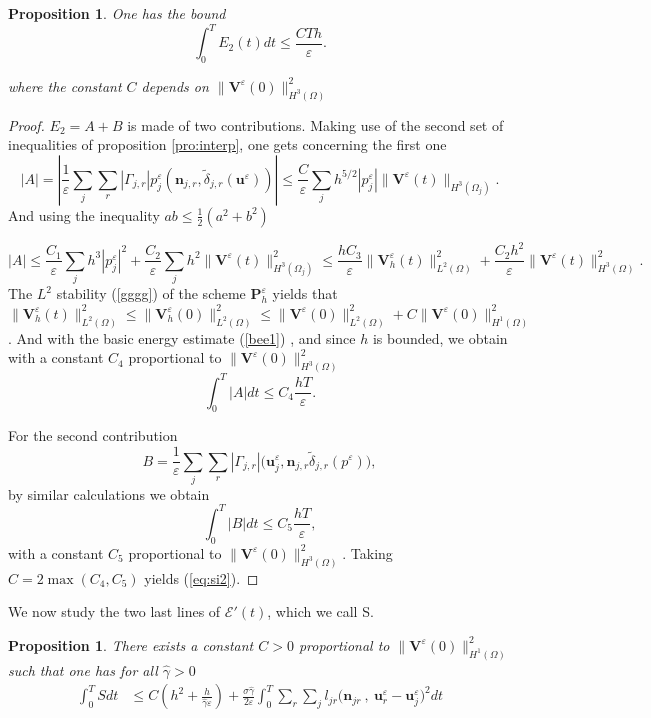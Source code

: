 \documentclass[a4paper,french,english,10pt]{article}
\newcommand\ljr{l_{jr}}
\newcommand\njr{\mathbf{n}_{jr}}
\newcommand\uu{\mathbf{u}}
\newcommand\eps{\varepsilon}
\newtheorem{pro}[theorem]{Proposition}
\begin{document}
\begin{pro} \label{pro:e2}
One has the bound
\begin{equation} \label{eq:si2}
\int_0^T E_2(t) dt \leq  \frac{CTh}{\eps} .
\end{equation} 

where the constant $C$ depends   on $\|  \mathbf V ^\eps (0) \|^2_  { H^3(\Omega)  }$
\end{pro}
\begin{proof}
$E_2=A+B$ is made of two contributions.
Making use of the second set of inequalities
of proposition \ref{pro:interp}, one gets concerning the first one
$$
| A|= \left |
\frac{1}{\eps}\sum_j \sum_r  |\Gamma_{j,r} | p_j^{\eps} (\mathbf{n}_{j,r} ,
\tilde{\delta}_{j,r}(\uu^{\eps}) ) 
\right |
\leq 
\frac{C}{\eps}  \sum_j h^{5/2} | p_j  ^\eps |
 \|  \mathbf V ^\eps (t) \|_  { H^3(\Omega_j)  }.
$$
And using the inequality $ab\leq \frac{1}{2}(a^2+b^2)$ 

$$
| A|\leq 
\frac{C_1}{\eps}  \sum_j h^{3} | p_j  ^\eps |^2 + \frac{C_2}{\eps} \sum_j h^{2} 
 \|  \mathbf V ^\eps (t) \|^2_  { H^3(\Omega_j)  }
 \leq 
\frac{hC_3}{\eps} \|  \mathbf V_h ^\eps (t) \|^2_  { L^2(\Omega)  } + \frac{C_2h^2}{\eps}  
 \|  \mathbf V ^\eps (t) \|^2_  { H^3(\Omega)  }.
$$
The $L^2$ stability  (\ref{gggg})  of the scheme $\mathbf P_h ^\eps$ yields
that $\|  \mathbf V_h ^\eps (t) \|^2_  { L^2(\Omega)  }\leq
\|  \mathbf V_h ^\eps (0) \|^2_  { L^2(\Omega)  }\leq\|  \mathbf V ^\eps (0) \|^2_  { L^2(\Omega)  }+C \|  \mathbf V ^\eps (0) \|^2_  { H^1(\Omega)  } $.
And with  the basic energy estimate (\ref{bee1}) , and since $h$ is bounded, we obtain with a constant $C_4$ proportional to  $   \|  \mathbf V ^\eps (0) \|^2_  { H^3(\Omega)  }$ 
$$\int_0^T\vert A \vert dt \leq C_4 \frac{hT}{\eps}.$$

For the  second contribution$$
B=\frac{1}{\eps}\sum_j \sum_r |\Gamma_{j,r} | \bigg(
\mathbf{u}_j^{\eps} , \mathbf{n}_{j,r} \tilde{\delta}_{j,r}(p^{\eps}) \bigg),
$$
by similar calculations we obtain
$$\int_0^T\vert B \vert dt \leq C_5 \frac{hT}{\eps},$$
with a constant $C_5$ proportional to $  \|  \mathbf V ^\eps (0) \|^2_  { H^3(\Omega)  }$. Taking $C=2\max(C_4,C_5)$ yields (\ref{eq:si2}).
\end{proof}

We now study the two last lines of $\mathscr{E}'(t)$, which we call S. 
\begin{pro}  \label{pro:conv2}
There exists a constant $C>0$ proportional to $  \|  \mathbf V ^\eps (0) \|^2_  { H^1(\Omega)  }$ such that one has for all $\hat \gamma>0$ 
\begin{equation} \label{eq:bound3}
\begin{aligned}
\int_0^TSdt&\leq  C\left(  { h^2} +\frac{h}{ \widehat \gamma \eps}\right)
 +
 \frac{\sigma\hat \gamma}{2\eps}\int_0^T\sum_r \sum_j \ljr \bigg(  \njr  \: , \:
\mathbf{u}_r^{\eps}-\mathbf{u}_j^{\eps} \bigg)^2 dt
\end{aligned}
\end{equation}
\end{pro}
\end{document}
